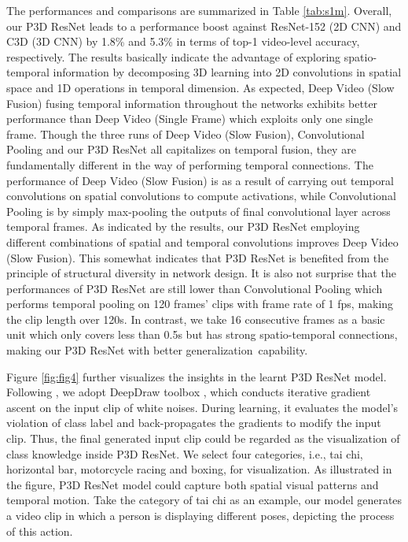 \documentclass[10pt,twocolumn,letterpaper]{article}
\begin{document}
The performances and comparisons are summarized in Table \ref{tab:s1m}. Overall, our P3D ResNet leads to a performance boost against ResNet-152 (2D CNN) and C3D (3D CNN) by 1.8\% and 5.3\% in terms of top-1 video-level accuracy, respectively. The results basically indicate the advantage of exploring spatio-temporal information by decomposing 3D learning into 2D convolutions in spatial space and 1D operations in temporal dimension. As expected, Deep Video (Slow Fusion) fusing temporal information throughout the networks exhibits better performance than Deep Video (Single Frame) which exploits only one single frame. Though the three runs of Deep Video (Slow Fusion), Convolutional Pooling and our P3D ResNet all capitalizes on temporal fusion, they are fundamentally different in the way of performing temporal connections. The performance of Deep Video (Slow Fusion) is as a result of carrying out temporal convolutions on spatial convolutions to compute activations, while Convolutional Pooling is by simply max-pooling the outputs of final convolutional layer across temporal frames. As indicated by the results, our P3D ResNet employing different combinations of spatial and temporal convolutions improves Deep Video (Slow Fusion). This somewhat indicates that P3D ResNet is benefited from the principle of structural diversity in network design. It is also not surprise that the performances of P3D ResNet are still lower than Convolutional Pooling which performs temporal pooling on 120 frames' clips with frame rate of 1 fps, making the clip length over 120s. In contrast, we take 16 consecutive frames as a basic unit which only covers less than 0.5s but has strong spatio-temporal connections, making our P3D ResNet with better generalization~capability.

Figure \ref{fig:fig4} further visualizes the insights in the learnt P3D ResNet model. Following \cite{wang2016temporal}, we adopt DeepDraw toolbox \cite{deepdraw}, which conducts iterative gradient ascent on the input clip of white noises. During learning, it evaluates the model's violation of class label and back-propagates the gradients to modify the input clip. Thus, the final generated input clip could be regarded as the visualization of class knowledge inside P3D ResNet. We select four categories, i.e., tai chi, horizontal bar, motorcycle racing and boxing, for visualization. As illustrated in the figure, P3D ResNet model could capture both spatial visual patterns and temporal motion. Take the category of tai chi as an example, our model generates a video clip in which a person is displaying different poses, depicting the process of this action.
\end{document}
